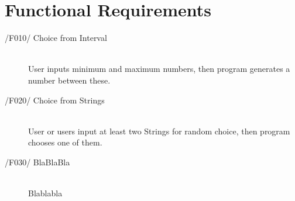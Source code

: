 \newpage
\section{Functional Requirements}

\begin{description}
\item[/F010/ Choice from Interval]\hfill \\ User inputs minimum and maximum numbers, then program generates a number between these.
\item[/F020/ Choice from Strings]\hfill \\ User or users input at least two Strings for random choice, then program chooses one of them.
\item[/F030/ BlaBlaBla]\hfill \\ Blablabla
\end{description}